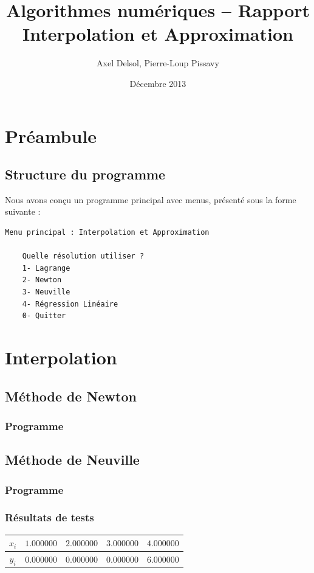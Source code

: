 \documentclass{report}
\title{Algorithmes numériques -- Rapport \\ \vspace{0.5cm}Interpolation et Approximation}
\author{Axel Delsol, Pierre-Loup Pissavy}
\date{Décembre 2013}
\begin{document}
  \maketitle
  \tableofcontents

  \chapter{Préambule}
    \section{Structure du programme}
    Nous avons conçu un programme principal avec menus, présenté sous la forme suivante :
    \begin{lstlisting}[style=apercu, name=Menu Principal]
    Menu principal : Interpolation et Approximation

    Quelle résolution utiliser ?
    1- Lagrange
    2- Newton
    3- Neuville
    4- Régression Linéaire
    0- Quitter
    \end{lstlisting}
  \chapter{Interpolation}
    \section{Méthode de Newton}
      \subsection{Programme}
	
	\renewcommand{\arraystretch}{2}
	\renewcommand{\arraystretch}{1}
    \section{Méthode de Neuville}
      \subsection{Programme}
	
      \subsection{Résultats de tests}
	\begin{tabular}{| c | c | c | c | c |}
	\hline 
	$x_{i}$ & $1.000000$ & $2.000000$ & $3.000000$ & $4.000000 $ \\ 
	\hline 
	$y_{i}$ & $0.000000$ & $0.000000$ & $0.000000$ & $6.000000 $ \\ 
	\hline 
	\end{tabular}
\end{document}
